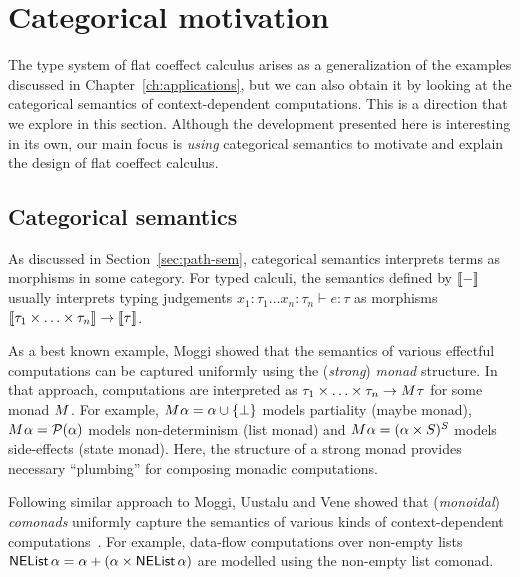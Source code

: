 \section{Categorical motivation}
\label{sec:flat-semantics}

The type system of flat coeffect calculus arises as a generalization of the examples discussed in 
Chapter~\ref{ch:applications}, but we can also obtain it by looking at the categorical semantics
of context-dependent computations. This is a direction that we explore in this section. Although
the development presented here is interesting in its own, our main focus is \emph{using} categorical
semantics to motivate and explain the design of flat coeffect calculus.


\subsection{Categorical semantics}

As discussed in Section~\ref{sec:path-sem}, categorical semantics interprets terms as morphisms
in some category. For typed calculi, the semantics defined by $\llbracket - \rrbracket$ usually interprets typing 
judgements $x_1 \!:\! \tau_1 \ldots x_n \!:\! \tau_n \vdash e: \tau$ as morphisms 
$\llbracket \tau_1 \times \ldots \times \tau_n \rrbracket \rightarrow \llbracket \tau \rrbracket$.

As a best known example, Moggi \cite{monad-notions} showed that the semantics of various effectful 
computations can be captured uniformly using the (\emph{strong}) \emph{monad} structure. In that 
approach, computations are interpreted as $\tau_1 \times \ldots \times \tau_n \rightarrow M^{}\tau$
for some monad $M^{}$. For example, $M^{}\alpha = \alpha \cup \{ \bot \}$ models 
partiality (maybe monad), $M^{}\alpha = \mathcal{P}(\alpha)$ models non-determinism (list 
monad) and $M^{}\alpha = (\alpha \times S)^S$ models side-effects (state monad). Here, the 
structure of a strong monad provides necessary ``plumbing'' for composing monadic computations.

Following similar approach to Moggi, Uustalu and Vene \cite{comonads-notions} showed that 
(\emph{monoidal}) \emph{comonads} uniformly capture the semantics of various kinds of context-dependent 
computations~\cite{comonads-notions}. For example, data-flow computations over non-empty lists
$\ident{NEList}\,\alpha = \alpha + (\alpha \times \ident{NEList}\,\alpha)$ are modelled using
the non-empty list comonad.


